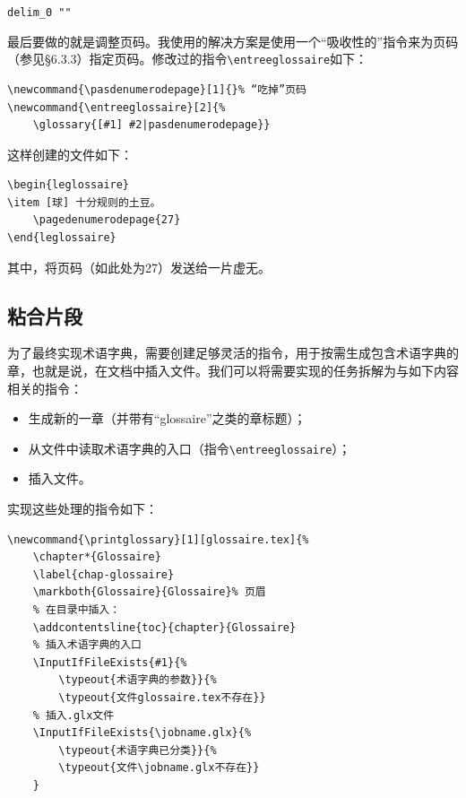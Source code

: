 \begin{dmd}
\verb|delim_0 ""|
\end{dmd}

最后要做的就是调整页码。我使用的解决方案是使用一个“吸收性的”指令来为页码（参见\S 6.3.3）指定页码。修改过的指令\verb|\entreeglossaire|如下：

\begin{dmd}
\begin{verbatim}
\newcommand{\pasdenumerodepage}[1]{}% “吃掉”页码
\newcommand{\entreeglossaire}[2]{%
    \glossary{[#1] #2|pasdenumerodepage}}
\end{verbatim}
\end{dmd}

这样创建的文件如下：

\begin{dmd}
\begin{verbatim}
\begin{leglossaire}
\item [球] 十分规则的土豆。
    \pagedenumerodepage{27}
\end{leglossaire}
\end{verbatim}
\end{dmd}

其中，将页码（如此处为27）发送给一片虚无。

\subsection{粘合片段}

为了最终实现术语字典，需要创建足够灵活的指令，用于按需生成包含术语字典的章，也就是说，在文档中插入文件。我们可以将需要实现的任务拆解为与如下内容相关的指令：

\begin{itemize}
    \item 生成新的一章（并带有“glossaire”之类的章标题）；
    \item 从文件中读取术语字典的入口（指令\verb|\entreeglossaire|）；
    \item 插入文件。
\end{itemize}

实现这些处理的指令如下：

\begin{dmd}
\begin{verbatim}
\newcommand{\printglossary}[1][glossaire.tex]{% 
    \chapter*{Glossaire}
    \label{chap-glossaire} 
    \markboth{Glossaire}{Glossaire}% 页眉
    % 在目录中插入：
    \addcontentsline{toc}{chapter}{Glossaire}
    % 插入术语字典的入口
    \InputIfFileExists{#1}{%
        \typeout{术语字典的参数}}{%
        \typeout{文件glossaire.tex不存在}}
    % 插入.glx文件
    \InputIfFileExists{\jobname.glx}{%
        \typeout{术语字典已分类}}{%
        \typeout{文件\jobname.glx不存在}}
    }
\end{verbatim}
\end{dmd}

